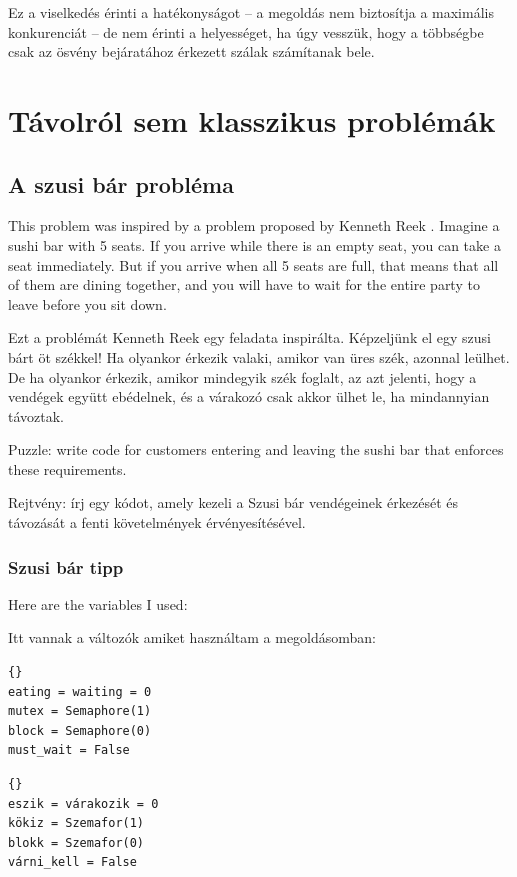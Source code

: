 \documentclass{book}
\newcommand{\clearemptydoublepage}{\newpage\cleardoublepage}
\begin{document}
Ez a viselkedés érinti a hatékonyságot -- a megoldás nem
biztosítja a maximális konkurenciát -- de nem érinti
a helyességet, ha úgy vesszük, hogy a többségbe csak
az ösvény bejáratához érkezett szálak számítanak bele.

\clearemptydoublepage
\chapter{Távolról sem klasszikus problémák}


\section{A szusi bár probléma}

This problem was inspired by a problem proposed by Kenneth Reek \cite{reek}.
Imagine a sushi bar with 5 seats.  If you arrive while there is an
empty seat, you can take a seat immediately.  But if you arrive when
all 5 seats are full, that means that all of them are dining together,
and you will have to wait for the entire party to leave before you
sit down.

Ezt a problémát Kenneth Reek \cite{reek} egy feladata inspirálta.
Képzeljünk el egy szusi bárt öt székkel! Ha olyankor érkezik valaki,
amikor van üres szék, azonnal leülhet. De ha olyankor érkezik, amikor
mindegyik szék foglalt, az azt jelenti, hogy a vendégek együtt ebédelnek,
és a várakozó csak akkor ülhet le, ha mindannyian távoztak.

Puzzle: write code for customers entering and
leaving the sushi bar that enforces these requirements.

Rejtvény: írj egy kódot, amely kezeli a Szusi bár vendégeinek
érkezését és távozását a fenti követelmények érvényesítésével.

\clearemptydoublepage
\subsection{Szusi bár tipp}

Here are the variables I used:

Itt vannak a változók amiket használtam a
megoldásomban:

\begin{lstlisting}[title={Sushi bar hint}]{}
eating = waiting = 0
mutex = Semaphore(1)
block = Semaphore(0)
must_wait = False
\end{lstlisting}

\begin{lstlisting}[title={Szusi bár tipp}]{}
eszik = várakozik = 0
kökiz = Szemafor(1)
blokk = Szemafor(0)
várni_kell = False
\end{lstlisting}
\end{document}
